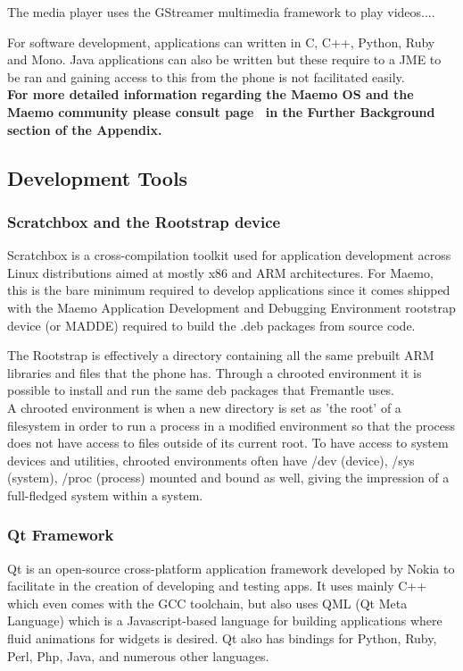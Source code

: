 The media player uses the GStreamer multimedia framework to play videos....

For software development, applications can written in C, C++, Python, Ruby and Mono. Java applications can also be written but these require to a JME to be ran and gaining access to this from the phone is not facilitated easily.\\

{\small\bf For more detailed information regarding the Maemo OS and the Maemo community please consult page~\pageref{maemocomm} in the Further Background section of the Appendix.}

\subsection{Development Tools}
\subsubsection{Scratchbox and the Rootstrap device}
Scratchbox is a cross-compilation toolkit used for application development across Linux distributions aimed at mostly x86 and ARM architectures. For Maemo, this is the bare minimum required to develop applications since it comes shipped with the Maemo Application Development and Debugging Environment rootstrap device (or MADDE) required to build the .deb packages from source code.

The Rootstrap is effectively a directory containing all the same prebuilt ARM libraries and files that the phone has. Through a chrooted environment it is possible to install and run the same deb packages that Fremantle uses. \\A chrooted environment is when a new directory is set as 'the root' of a filesystem in order to run a process in a modified environment so that the process does not have access to files outside of its current root. To have access to system devices and utilities, chrooted environments often have  /dev (device), /sys (system), /proc (process) mounted and bound as well, giving the impression of a full-fledged system within a system.

\subsubsection{Qt Framework} 
Qt is an open-source cross-platform application framework developed by Nokia to facilitate in the creation of developing and testing apps.  It uses mainly C++ which even comes with the GCC toolchain, but also uses QML (Qt Meta Language) which is a Javascript-based language for building applications where fluid animations for widgets is desired. Qt also has bindings for Python, Ruby, Perl, Php, Java, and numerous other languages.\\

